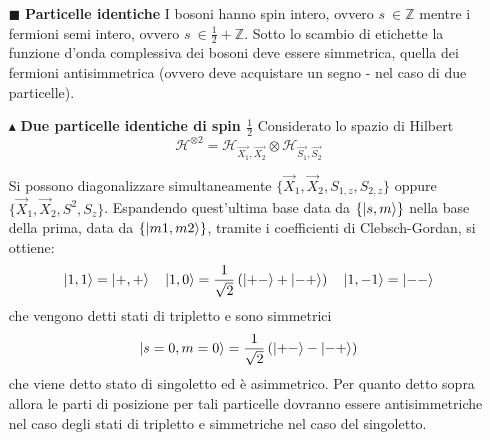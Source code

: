 \documentclass{book}
\newcommand{\g}{\textbf}
\newcommand{\e}{\begin{equation}}
\newcommand{\ex}{\end{equation} }
\begin{document}
\begin{multicols}{4}
\begin{itemize}
\item [$\blacksquare$] \g{Particelle identiche }
I bosoni hanno spin intero, ovvero $s \ \in \mathbb{Z}$ mentre i fermioni semi intero, ovvero $s \ \in \frac{1}{2} + \mathbb{Z}$.
Sotto lo scambio di etichette la funzione d'onda complessiva dei bosoni deve essere simmetrica, quella dei fermioni antisimmetrica (ovvero deve acquistare un segno - nel caso di due particelle). 

\item [$\blacktriangle$] \g{Due particelle identiche di spin $\frac{1}{2}$}
Considerato lo spazio di Hilbert
\e{\mathcal{H}^{\otimes 2} = \mathcal{H}_{\vec{X_{1}}, \vec{X_{2}}} \otimes \mathcal{H}_{\vec{S_{1}}, 
\vec{S_{2}} }}\ex

Si possono diagonalizzare simultaneamente 
$ \{ \vec{X}_1, \vec{X}_2, S_{1,z}, S_{2,z} \}$ oppure $ \{ \vec{X}_1, \vec{X}_2, S^{2}, S_{z} \}$. Espandendo quest'ultima base data da $\{\ket{s,m}\}$ nella base della prima, data da $\{\ket{m1, m2}\}$, tramite i coefficienti di Clebsch-Gordan, si ottiene:
\e{\ket{1,1} = \ket{+,+} \quad \ket{1,0} = \frac{1}{\sqrt{2}}\left(\ket{+-} + \ket{-+}\right) \quad \ket{1,-1} = \ket{--}}\ex
che vengono detti stati di tripletto e sono simmetrici
\e{\ket{s=0,m=0} = \frac{1}{\sqrt{2}}\left(\ket{+-} - \ket{-+}\right)}\ex
che viene detto stato di singoletto ed è asimmetrico. 
Per quanto detto sopra allora le parti di posizione per tali particelle dovranno essere antisimmetriche nel caso degli stati di tripletto e simmetriche nel caso del singoletto. 


\end{itemize}
\end{multicols}
\end{document}
